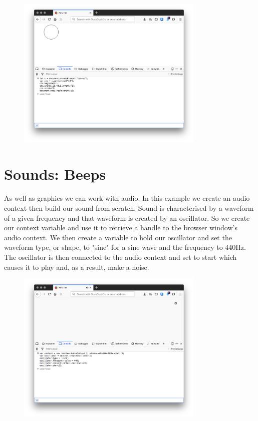 \begin{figure}[H]
\centering
\includegraphics[width=0.8\textwidth]{figures/js-graphics}
\label{fig:js-graphics}
\caption{}
\end{figure}


\section{Sounds: Beeps}
\paragraph{} As well as graphics we can work with audio. In this example we create an audio context then build our sound from scratch. Sound is characterised by a waveform of a given frequency and that waveform is created by an oscillator. So we create our context variable and use it to retrieve a handle to the browser window's audio context. We then create a variable to hold our oscillator and set the waveform type, or shape, to "sine" for a sine wave and the frequency to 440Hz. The oscillator is then connected to the audio context and set to start which causes it to play and, as a result, make a noise.


\begin{figure}[H]
\centering
\includegraphics[width=0.8\textwidth]{figures/js-sounds}
\label{fig:js-sounds}
\caption{}
\end{figure}


